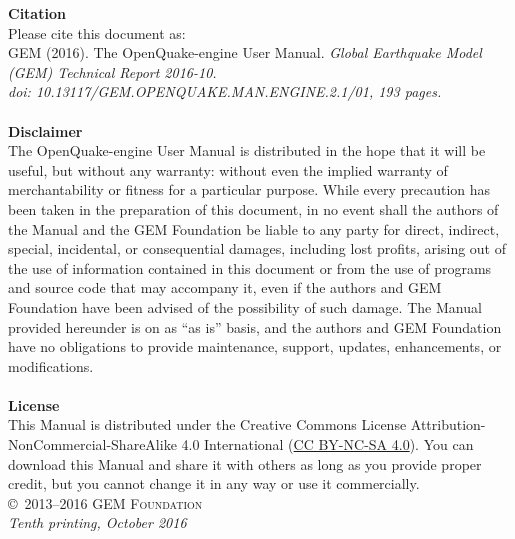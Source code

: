 \documentclass[11pt,fleqn]{book} %
\begin{document}
\noindent
   {\textbf{Citation}} \hfill \\
   Please cite this document as: \hfill \\
   GEM (2016). The OpenQuake-engine User Manual.
   \textit{Global Earthquake Model (GEM) Technical Report 2016-10.\\
   doi: 10.13117/GEM.OPENQUAKE.MAN.ENGINE.2.1/01, 193 pages.} \hfill \\
\noindent \hfill\\
\noindent
   {\bf{Disclaimer}} \hfill \\
   The OpenQuake-engine User Manual is distributed in the hope that it will be
   useful, but without any warranty: without even the implied warranty of
   merchantability or fitness for a particular purpose. While every precaution
   has been taken in the preparation of this document, in no event shall the
   authors of the Manual and the GEM Foundation be liable to any party for
   direct, indirect, special, incidental, or consequential damages, including
   lost profits, arising out of the use of information contained in this
   document or from the use of programs and source code that may accompany it,
   even if the authors and GEM Foundation have been advised of the possibility
   of such damage. The Manual provided hereunder is on as ``as is'' basis, and
   the  authors and GEM Foundation have no obligations to provide maintenance,
   support, updates, enhancements, or modifications. \hfill \\
\noindent \hfill\\
\noindent
   {\bf{License}} \hfill \\
   This Manual is distributed under the Creative Commons License  Attribution-
   NonCommercial-ShareAlike 4.0 International
   (\href{http://creativecommons.org/licenses/by-nc-sa/4.0/} {CC BY-NC-SA
   4.0}). You can download this Manual and share it with others as long as you
   provide proper credit, but you cannot change it in any way or use it
   commercially.\hfill \\

\noindent \copyright\ \textsc{2013--2016 GEM Foundation}\\
\noindent \textit{Tenth printing, October 2016} %


\pagestyle{empty} %
\tableofcontents %
\cleardoublepage %
\pagestyle{fancy} %
\end{document}
